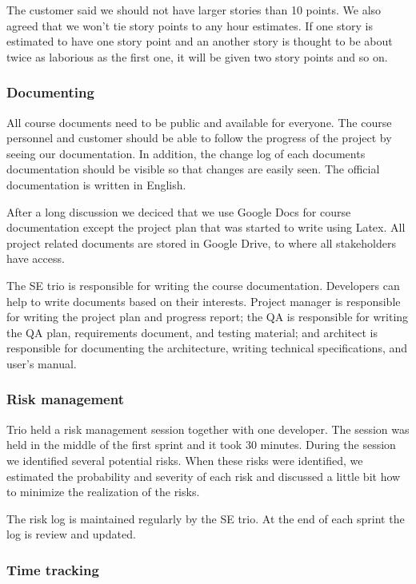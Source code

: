 The customer said we should not have larger stories than 10 points. We also
agreed that we won't tie story points to any hour estimates. If one story is
estimated to have one story point and an another story is thought to be about
twice as laborious as the first one, it will be given two story points and so
on.

\subsubsection{Documenting}

All course documents need to be public and available for everyone. The course 
personnel and customer should be able to follow the progress of the project by 
seeing our documentation. In addition, the change log of each documents 
documentation should be visible so that changes are easily seen. The official
documentation is written in English.

After a long discussion we deciced that we use Google Docs for course
documentation except the project plan that was started to write using Latex. All
project related documents are stored in Google Drive, to where all stakeholders
have access.

The SE trio is responsible for writing the course documentation. 
Developers can help to write documents based on their interests. Project manager
is responsible for writing the project plan and progress report; the QA is
responsible for writing the QA plan, requirements document, and testing
material; and architect is responsible for documenting the architecture, writing
technical specifications, and user's manual.

\subsubsection{Risk management}

Trio held a risk management session together with one developer. The session was
held in the middle of the first sprint and it took 30 minutes. During the
session we identified several potential risks. When these risks were identified,
we estimated the probability and severity of each risk and discussed a little
bit how to minimize the realization of the risks.

The risk log is maintained regularly by the SE trio. At the end of each sprint
the log is review and updated.

\subsubsection{Time tracking}

